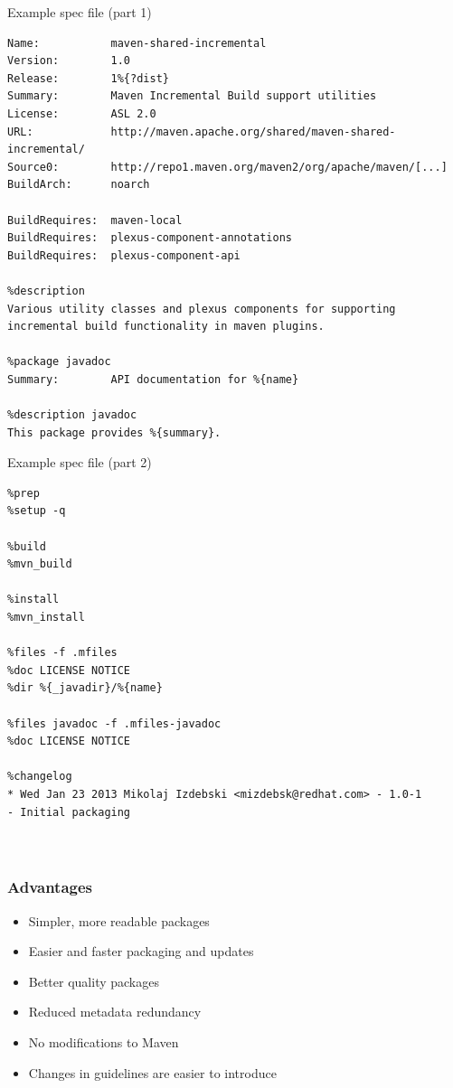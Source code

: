 \documentclass[pdftex,unicode,xcolor=table]{beamer}
\begin{document}
\begin{frame}[fragile]
  \begin{block}{Example spec file (part 1)}
    \scriptsize
\begin{verbatim}
Name:           maven-shared-incremental
Version:        1.0
Release:        1%{?dist}
Summary:        Maven Incremental Build support utilities
License:        ASL 2.0
URL:            http://maven.apache.org/shared/maven-shared-incremental/
Source0:        http://repo1.maven.org/maven2/org/apache/maven/[...]
BuildArch:      noarch

BuildRequires:  maven-local
BuildRequires:  plexus-component-annotations
BuildRequires:  plexus-component-api

%description
Various utility classes and plexus components for supporting
incremental build functionality in maven plugins.

%package javadoc
Summary:        API documentation for %{name}

%description javadoc
This package provides %{summary}.
\end{verbatim}
  \end{block}
\end{frame}


\begin{frame}[fragile]
  \begin{block}{Example spec file (part 2)}
    \scriptsize
\begin{verbatim}
%prep
%setup -q

%build
%mvn_build

%install
%mvn_install

%files -f .mfiles
%doc LICENSE NOTICE
%dir %{_javadir}/%{name}

%files javadoc -f .mfiles-javadoc
%doc LICENSE NOTICE

%changelog
* Wed Jan 23 2013 Mikolaj Izdebski <mizdebsk@redhat.com> - 1.0-1
- Initial packaging



\end{verbatim}
  \end{block}
\end{frame}

\begin{frame}
  \frametitle{Advantages}
  \begin{itemize}
    \item Simpler, more readable packages
    \item Easier and faster packaging and updates
    \item Better quality packages
    \item Reduced metadata redundancy
    \item No modifications to Maven
    \item Changes in guidelines are easier to introduce
  \end{itemize}
\end{frame}
\end{document}
